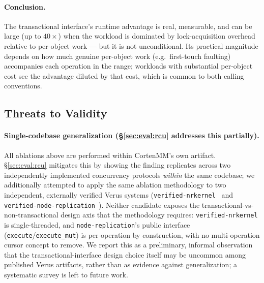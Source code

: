 \documentclass[10pt]{article}
\begin{document}
\paragraph{Conclusion.} The transactional interface's runtime advantage
is real, measurable, and can be large (up to $40\times$) when the
workload is dominated by lock-acquisition overhead relative to
per-object work --- but it is not unconditional. Its practical magnitude
depends on how much genuine per-object work (e.g.\ first-touch faulting)
accompanies each operation in the range; workloads with substantial
per-object cost see the advantage diluted by that cost, which is common
to both calling conventions.

\subsection{Threats to Validity}
\label{sec:eval:threats}

\paragraph{Single-codebase generalization (\S\ref{sec:eval:rcu}
addresses this partially).} All ablations above are performed within
CortenMM's own artifact. \S\ref{sec:eval:rcu} mitigates this by showing
the finding replicates across two independently implemented concurrency
protocols \emph{within} the same codebase; we additionally attempted to
apply the same ablation methodology to two independent, externally
verified Verus systems
(\texttt{verified-nrkernel}~\cite{nrkernel} and
\texttt{verified-node-replication}~\cite{nr}). Neither candidate exposes
the transactional-vs-non-transactional design axis that the methodology
requires: \texttt{verified-nrkernel} is single-threaded, and
\texttt{node-replication}'s public interface
(\texttt{execute}/\texttt{execute\_mut}) is per-operation by
construction, with no multi-operation cursor concept to remove. We
report this as a preliminary, informal observation that the
transactional-interface design choice itself may be uncommon among
published Verus artifacts, rather than as evidence against
generalization; a systematic survey is left to future work.

\label{sec:eval:tooling}
\end{document}
